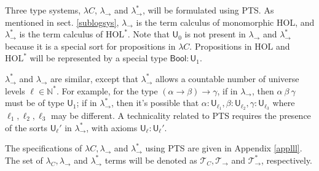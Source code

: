   Three type systems, $\lambda C$, $\lambda_\to$ and $\lambda_\to^*$, will be formulated
  using PTS. As mentioned in sect. \ref{sublogsys}, $\lambda_\to$
  is the term calculus of monomorphic HOL, and $\lambda_\to^*$ is the term
  calculus of $\text{HOL}^*$. Note that $\mathsf{U}_0$ is not present in $\lambda_\to$ and $\lambda_\to^*$
  because it is a special sort for propositions in $\lambda C$.
  Propositions in $\text{HOL}$ and $\text{HOL}^*$ will be represented by
  a special type $\mathsf{Bool} : \mathsf{U}_1$.
  
  $\lambda_\to^*$ and $\lambda_\to$ are similar, except that $\lambda_\to^*$ allows a
  countable number of universe levels $\ell \in \mathbb{N}^*$. For example,
  for the type $(\alpha \to \beta) \to \gamma$, if in $\lambda_\to$,
  then $\alpha \ \beta \ \gamma$ must be of type $\mathsf{U}_1$; if in
  $\lambda_\to^*$, then it's possible that $\alpha : \mathsf{U}_{\ell_1},
  \beta : \mathsf{U}_{\ell_2}, \gamma : \mathsf{U}_{\ell_3}$ where $\ell_1, \ell_2, \ell_3$
  may be different. A technicality related to PTS requires the presence of
  the sorts $\mathsf{U}_\ell'$ in $\lambda_\to^*$, with axioms $\mathsf{U}_\ell : \mathsf{U}_\ell'$.

  The specifications of $\lambda C, \lambda_\to$ and $\lambda_\to^*$ using PTS are given in
  Appendix \ref{applll}. The set of $\lambda_C, \lambda_\to$ and $\lambda_\to^*$ terms will be
  denoted as $\mathcal{T}_C, \mathcal{T}_\to$ and $\mathcal{T}_\to^*$, respectively.